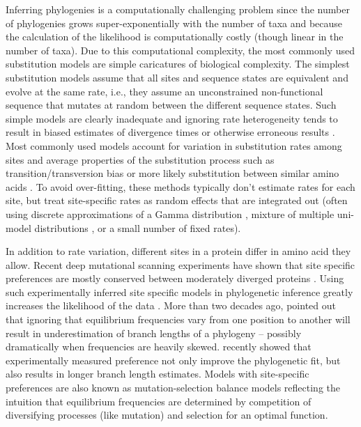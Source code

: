 \documentclass[aps,rmp,twocolumn]{revtex4}
\begin{document}
Inferring phylogenies is a computationally challenging problem since the number of phylogenies grows super-exponentially with the number of taxa and because the calculation of the likelihood is computationally costly (though linear in the number of taxa).
Due to this computational complexity, the most commonly used substitution models are simple caricatures of biological complexity.
The simplest substitution models assume that all sites and sequence states are equivalent and evolve at the same rate, i.e., they assume an unconstrained non-functional sequence that mutates at random between the different sequence states.
Such simple models are clearly inadequate and ignoring rate heterogeneity tends to result in biased estimates of divergence times or otherwise erroneous results \citep{yang1996among}.
Most commonly used models account for variation in substitution rates among sites and average properties of the substitution process such as transition/transversion bias or more likely substitution between similar amino acids \citep{yang_maximum_1994,FastTree2,nguyen_iq-tree:_2015,stamatakis_raxml_2014}.
To avoid over-fitting, these methods typically don't estimate rates for each site, but treat site-specific rates as random effects that are integrated out (often using discrete approximations of a Gamma distribution \citep{yang1996among}, mixture of multiple uni-model distributions \citep{mayrose2005gamma}, or a small number of fixed rates).

In addition to rate variation, different sites in a protein differ in amino acid they allow.
Recent deep mutational scanning experiments have shown that site specific preferences are mostly conserved between moderately diverged proteins \citep{doud_site-specific_2015}.
Using such experimentally inferred site specific models in phylogenetic inference greatly increases the likelihood of the data \cite{bloom2014experimentally}.
More than two decades ago, \citet{halpern_evolutionary_1998} pointed out that ignoring that equilibrium frequencies vary from one position to another will result in underestimation of branch lengths of a phylogeny -- possibly dramatically when frequencies are heavily skewed.
\citet{hilton_modeling_2018} recently showed that experimentally measured preference not only improve the phylogenetic fit, but also results in longer branch length estimates.
Models with site-specific preferences are also known as mutation-selection balance models \citep{bruno1996modeling,yang2008mutation} reflecting the intuition that equilibrium frequencies are determined by competition of diversifying processes (like mutation) and selection for an optimal function.
\end{document}
